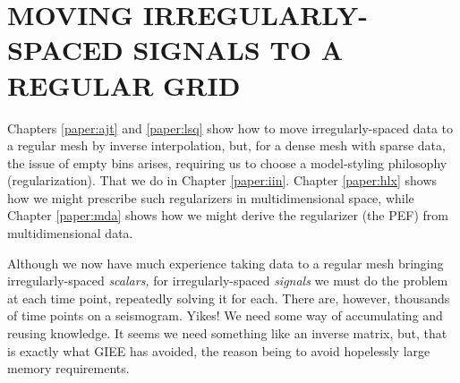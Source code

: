 
\section{MOVING IRREGULARLY-SPACED SIGNALS TO A REGULAR GRID}
Chapters
\ref{paper:ajt}
and
\ref{paper:lsq}
show how to move irregularly-spaced data to a regular mesh
by inverse interpolation,
but, for a dense mesh with sparse data,
the issue of empty bins arises,
requiring us to choose a model-styling philosophy (regularization).
That we do in Chapter 
\ref{paper:iin}.
Chapter
\ref{paper:hlx}
shows how we might prescribe such regularizers in multidimensional space,
while Chapter
\ref{paper:mda}
shows how we might derive the regularizer (the PEF) from multidimensional data.

Although we now have much experience
taking data to a regular mesh
bringing
irregularly-spaced
{\em scalars,}
for irregularly-spaced
{\em signals}
we must do the problem at each time point,
repeatedly solving it for each.
There are, however, thousands of time points on a seismogram.  Yikes!
We need some way of accumulating and reusing knowledge.
It seems we need something like an inverse matrix,
but, that is exactly what GIEE has avoided,
the reason being to avoid hopelessly large memory requirements.


